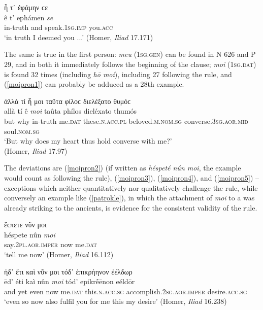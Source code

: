 \begin{exe}
\ex ἦ τ᾽ ἐφάμην ϲε\\
\gll ê t' ephámēn \emph{se}\\
in-truth and speak.\textsc{1sg.imp} you.\textsc{acc}\\
\trans `in truth I deemed you ...' (Homer, \textit{Iliad} 17.171)
\label{se2}
\end{exe}

The same is true in the first person: \textit{meu} (\textsc{1sg.gen}) can be found in Ν 626 and Ρ 29, and in both it immediately follows the beginning of the clause; \textit{moi} (\textsc{1sg.dat}) is found 32 times (including \textit{hō moi}), including 27 following the rule, and (\ref{moipron1})
can probably be adduced as a 28th example.

\begin{exe}
\ex ἀλλὰ τί ἦ {μοι} ταῦτα φίλοϲ διελέξατο θυμόϲ\\
\gll allà tí ê \emph{moi} taûta phílos dieléxato thumós\\
but why in-truth me.\textsc{dat} these.\textsc{n.acc.pl} beloved.\textsc{m.nom.sg} converse.\textsc{3sg.aor.mid} soul.\textsc{nom.sg}\\
\trans `But why does my heart thus hold converse with me?'\\
(Homer, \textit{Iliad} 17.97)
\label{moipron1}
\end{exe}

The deviations are (\ref{moipron2}) (if written as \textit{héspeté nún moi}, the example would count as following the rule), (\ref{moipron3}), (\ref{moipron4}), and (\ref{moipron5}) -- exceptions which neither quantitatively nor qualitatively challenge the rule, while conversely an example like (\ref{patrokle}), in which the attachment of \textit{moi} to a  was already striking to the ancients, is evidence for the consistent validity of the rule. 

\begin{exe}
\ex ἕϲπετε νῦν {μοι}\\
\gll héspete nûn \emph{moi}\\
say.\textsc{2pl.aor.imper} now me\textsc{.dat}\\
\trans `tell me now' (Homer, \textit{Iliad} 16.112)
\label{moipron2}
\end{exe}

\begin{exe}
\ex ἠδ᾽ ἔτι καὶ νῦν {μοι} τόδ᾽ ἐπικρήηνον ἐέλδωρ\\
\gll ēd' éti kaì nûn \emph{moi} tód' epikrḗēnon eéldōr\\
and yet even now me.\textsc{dat} this.\textsc{n.acc.sg} accomplish.\textsc{2sg.aor.imper} desire.\textsc{acc.sg}\\
\trans `even so now also fulfil you for me this my desire' (Homer, \textit{Iliad} 16.238)
\label{moipron3}
\end{exe}

